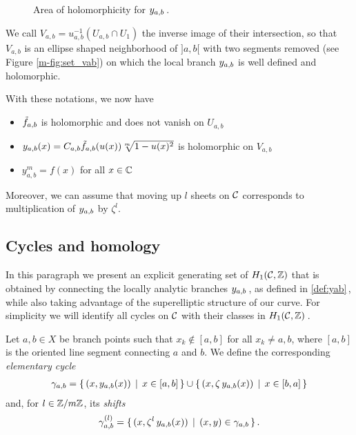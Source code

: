 \documentclass[main.tex]{subfiles}
\begin{document}
  \begin{figure}[H] \begin{center} 
  \end{center} \caption{Area of holomorphicity for $y_{a,b}$\,.}
  \label{fig:set_vab} \end{figure}

  We call $V_{a,b} = u_{a,b}^{-1}(U_{a,b}\cap U_1)$ the inverse image of their intersection,
  so that $V_{a,b}$ is an ellipse shaped neighborhood of $]a,b[$ with two segments removed
      (see Figure \ref{m-fig:set_vab})
      on which the local branch $y_{a,b}$ is well defined and holomorphic.

  With these notations, we now have
  \begin{prop}
     \begin{itemize}
         \item $\tilde{f}_{a,b}$ is holomorphic and does not vanish on $U_{a,b}$
         \item $y_{a,b}(x) = C_{a,b} \tilde{f}_{a,b}(u(x)) \sqrt[m]{1-u(x)^2}$ is holomorphic
         on $V_{a,b}$
         \item $y_{a,b}^m = f(x)$ for all $x\in\mathbb{C}$
     \end{itemize} 
     Moreover, we can assume that moving up $l$ sheets on $\mathcal{C}$
     corresponds to multiplication of $y_{a,b}$ by $\zeta^l$. 
 \end{prop}


  \subsection{Cycles and homology}\label{subsec:cycles_homo}
    
   In this paragraph we present an explicit generating set of $H_1(\mathcal{C},\mathbb{Z})$ that is obtained by connecting the locally analytic branches $y_{a,b}$\,, as defined in \eqref{def:yab}\,,
   while also taking advantage of the superelliptic structure of our curve.
   For simplicity we will identify all cycles on $\mathcal{C}$ with their classes in $H_1(\mathcal{C},\mathbb{Z})$\,.
   
   \begin{defn}\label{def:elem_cycle}
   Let $a, b \in X$ be branch points such that $x_k \not\in [a,b]$ for all $x_k \ne a,b$, where  $[a,b]$ is the oriented line segment connecting $a$ and $b$.  
   We define the corresponding \textit{elementary cycle} 
   \begin{align}
    \gamma_{a,b} = \{ \, (x,y_{a,b}(x)) \, \mid \, x \in [a,b] \, \} \cup \{ \,(x,\zeta \, y_{a,b}(x)) \, \mid \, x \in [b,a] \, \}
   \end{align}
   and, for $l \in \mathbb{Z}/m\mathbb{Z}$, its \textit{shifts}
   \begin{align}
    \gamma_{a,b}^{(l)} = \{ \, (x,\zeta^l \,y_{a,b}(x)) \, \mid \, (x,y) \in \gamma_{a,b} \, \}\,. 
   \end{align}
    \end{defn}
    
\end{document}
